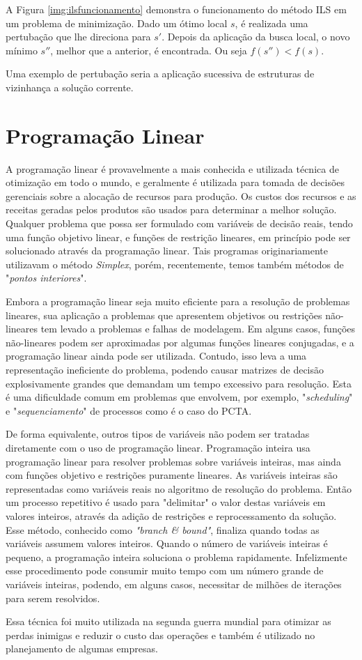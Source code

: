 A Figura \ref{img:ilsfuncionamento} demonstra o funcionamento do método ILS em um problema de minimização. Dado um ótimo local $s$, é realizada uma pertubação que lhe direciona para $s{'}$. Depois da aplicação da busca local, o novo mínimo $s{''}$, melhor que a anterior, é encontrada. Ou seja $f(s{''}) < f(s)$.

Uma exemplo de pertubação seria a aplicação sucessiva de estruturas de vizinhança a solução corrente.

\section{Programação Linear}

A programação linear é provavelmente a mais conhecida e utilizada técnica de
otimização em todo o mundo, e geralmente é utilizada para tomada de
decisões gerenciais sobre a alocação de recursos para produção. Os custos dos recursos e
as receitas geradas pelos produtos são usados para determinar a melhor solução.
Qualquer problema que possa ser formulado com variáveis de decisão reais, tendo
uma função objetivo linear, e funções de restrição lineares, em princípio pode
ser solucionado através da programação linear. Tais programas originariamente
utilizavam o método \textit{Simplex}, porém, recentemente, temos também métodos
de "\textit{pontos interiores}".

Embora a programação linear seja muito eficiente para a resolução de problemas
lineares, sua aplicação a problemas que apresentem objetivos ou restrições
não-lineares tem levado a problemas e falhas de modelagem. Em alguns casos,
funções não-lineares podem ser aproximadas por algumas funções lineares
conjugadas, e a programação linear ainda pode ser utilizada. Contudo, isso leva
a uma representação ineficiente do problema, podendo causar matrizes de decisão
explosivamente grandes que demandam um tempo excessivo para resolução. Esta é
uma dificuldade comum em problemas que envolvem, por exemplo,
"\textit{scheduling}" e "\textit{sequenciamento}" de processos como é o caso do
PCTA.

De forma equivalente, outros tipos de variáveis não podem ser tratadas
diretamente com o uso de programação linear. Programação inteira usa
programação linear para resolver problemas sobre variáveis inteiras, mas ainda
com funções objetivo e restrições puramente lineares. As variáveis inteiras são
representadas como variáveis reais no algoritmo de resolução do problema. Então
um processo repetitivo é usado para "delimitar" o valor destas variáveis em
valores inteiros, através da adição de restrições e reprocessamento da solução.
Esse método, conhecido como \textit{"branch \& bound"}, finaliza quando todas
as variáveis assumem valores inteiros. Quando o número de variáveis inteiras é
pequeno, a programação inteira soluciona o problema rapidamente. Infelizmente
esse procedimento pode consumir muito tempo com um número grande de variáveis
inteiras, podendo, em alguns casos, necessitar de milhões de iterações para
serem resolvidos.
 	
Essa técnica foi muito utilizada na segunda guerra mundial para otimizar as
perdas inimigas e reduzir o custo das operações e também é utilizado no
planejamento de algumas empresas.


